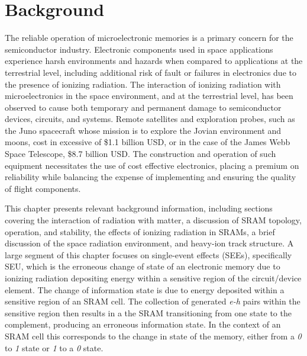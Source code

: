 \chapter{Background} %
\label{chap:background}
The reliable operation of microelectronic memories is a primary concern for the semiconductor industry. 
Electronic components used in space applications experience harsh environments and hazards when compared to applications at the terrestrial level, including additional risk of fault or failures in electronics due to the presence of ionizing radiation.
The interaction of ionizing radiation with microelectronics in the space environment, and at the terrestrial level, has been observed to cause both temporary and permanent damage to semiconductor devices, circuits, and systems.
Remote satellites and exploration probes, such as the Juno spacecraft whose mission is to explore the Jovian environment and moons, cost in excessive of \$1.1 billion USD, or in the case of the James Webb Space Telescope, \$8.7 billion USD.
The construction and operation of such equipment necessitates the use of cost effective electronics, placing a premium on reliability while balancing the expense of implementing and ensuring the quality of flight components.

This chapter presents relevant background information, including sections covering the interaction of radiation with matter, a discussion of SRAM topology, operation, and stability, the effects of ionizing radiation in SRAMs, a brief discussion of the space radiation environment, and heavy-ion track structure.
A large segment of this chapter focuses on single-event effects (SEEs), specifically SEU, which is the erroneous change of state of an electronic memory due to ionizing radiation depositing energy within a sensitive region of the circuit/device element. 
The change of information state is due to energy deposited within a sensitive region of an SRAM cell.
The collection of generated \emph{e-h} pairs within the sensitive region then results in a the SRAM transitioning from one state to the complement, producing an erroneous information state.
In the context of an SRAM cell this corresponds to the change in state of the memory, either from a \emph{0} to \emph{1} state or \emph{1} to a \emph{0} state.

